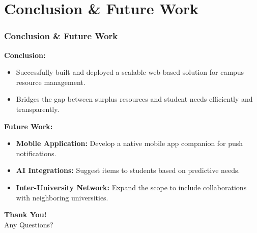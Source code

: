 \documentclass[10pt, compress, aspectratio=169]{beamer}
\begin{document}
\section{Conclusion \& Future Work}
\begin{frame}
    \frametitle{Conclusion \& Future Work}
    \textbf{Conclusion:}
    \begin{itemize}
        \item Successfully built and deployed a scalable web-based solution for campus resource management.
        \item Bridges the gap between surplus resources and student needs efficiently and transparently.
    \end{itemize}
    
    \vspace{0.3cm}
    \textbf{Future Work:}
    \begin{itemize}
        \item \textbf{Mobile Application:} Develop a native mobile app companion for push notifications.
        \item \textbf{AI Integrations:} Suggest items to students based on predictive needs.
        \item \textbf{Inter-University Network:} Expand the scope to include collaborations with neighboring universities.
    \end{itemize}
\end{frame}

\begin{frame}
    \begin{center}
        \Huge \textbf{Thank You!} \\
        \vspace{1cm}
        \Large Any Questions?
    \end{center}
\end{frame}
\end{document}
